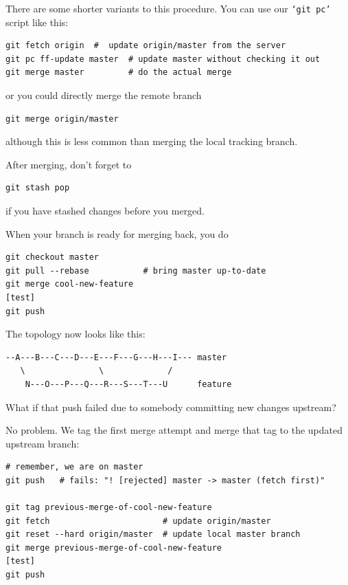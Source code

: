 \documentclass[12pt,pdftex]{article}
\begin{document}
There are some shorter variants to this procedure. You can use our
\texttt{‘git pc’} script like this:
\lstset{frame=single,basicstyle=\ttfamily\footnotesize,language=sh,label= ,caption= ,captionpos=b,numbers=none}
\begin{lstlisting}
git fetch origin  #  update origin/master from the server
git pc ff-update master  # update master without checking it out
git merge master         # do the actual merge
\end{lstlisting}
or you could directly merge the remote branch
\lstset{frame=single,basicstyle=\ttfamily\footnotesize,language=sh,label= ,caption= ,captionpos=b,numbers=none}
\begin{lstlisting}
git merge origin/master
\end{lstlisting}
although this is less common than merging the local tracking branch.

After merging, don't forget to
\lstset{frame=single,basicstyle=\ttfamily\footnotesize,language=sh,label= ,caption= ,captionpos=b,numbers=none}
\begin{lstlisting}
git stash pop
\end{lstlisting}
if you have stashed changes before you merged.

\bigskip

When your branch is ready for merging back, you do
\lstset{frame=single,basicstyle=\ttfamily\footnotesize,language=sh,label= ,caption= ,captionpos=b,numbers=none}
\begin{lstlisting}
git checkout master
git pull --rebase           # bring master up-to-date
git merge cool-new-feature
[test]
git push
\end{lstlisting}

The topology now looks like this:
\begin{verbatim}
--A---B---C---D---E---F---G---H---I--- master
   \               \             /
    N---O---P---Q---R---S---T---U      feature
\end{verbatim}

\bigskip

What if that push failed due to somebody committing new changes
upstream?

No problem.
We tag the first merge attempt and merge that tag to the updated
upstream branch:
\lstset{frame=single,basicstyle=\ttfamily\footnotesize,language=sh,label= ,caption= ,captionpos=b,numbers=none}
\begin{lstlisting}
# remember, we are on master
git push   # fails: "! [rejected] master -> master (fetch first)"

git tag previous-merge-of-cool-new-feature
git fetch                       # update origin/master
git reset --hard origin/master  # update local master branch
git merge previous-merge-of-cool-new-feature
[test]
git push
\end{lstlisting}
\end{document}
